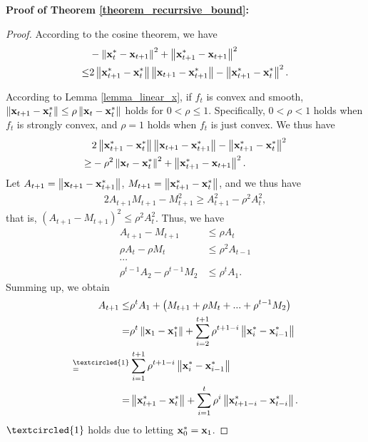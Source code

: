 \documentclass[journal]{IEEEtran}
\begin{document}
\textbf{Proof of Theorem \ref{theorem_recurrsive_bound}:}
\begin{proof}
According to the cosine theorem, we have 
\begin{align}
\label{equa_cosine}
&-  \lrnorm{\x_t^{\ast} - \x_{t+1}}^2   + \lrnorm { \x_{t+1}^{\ast} - \x_{t+1} }^2 \\ \nonumber 
\le &  2 \lrnorm {\x_{t+1}^{\ast} - \x_t^{\ast}} \lrnorm{\x_{t+1} - \x_{t+1}^{\ast}} - \lrnorm{\x_{t+1}^{\ast} - \x_t^{\ast}}^2.
\end{align} 

According to Lemma \ref{lemma_linear_x}, if $f_t$ is convex and smooth,  $\left\lVert{\bf x}_{t+1} - {\bf x}_t^{\ast}\right\rVert  \le \rho \left\lVert{\bf x}_{t} - {\bf x}_t^{\ast}\right\rVert$ holds for $0<\rho\le 1$. Specifically, $0<\rho <1$ holds when $f_t$ is strongly convex, and $\rho=1$ holds when $f_t$ is just convex.  We thus have 
\begin{align}
\nonumber
& 2 \left\lVert{\bf x}_{t+1}^{\ast} - {\bf x}_t^{\ast}\right\rVert \left\lVert{\bf x}_{t+1} - {\bf x}_{t+1}^{\ast}\right\rVert - \left\lVert{\bf x}_{t+1}^{\ast} - {\bf x}_t^{\ast}\right\rVert^2 \\ \nonumber  
\ge & -  \rho^2 \left\lVert{\bf x}_{t} - {\bf x}_t^{\ast}\right\rVert^2   + \left\lVert {\bf x}_{t+1}^{\ast} - {\bf x}_{t+1} \right\rVert^2.
\end{align} Let $A_{t+1} = \left\lVert{\bf x}_{t+1} - {\bf x}_{t+1}^{\ast}\right\rVert$, $M_{t+1} = \left\lVert{\bf x}_{t+1}^{\ast} - {\bf x}_t^{\ast}\right\rVert$, and we thus have 
\begin{align}
\nonumber
2A_{t+1}M_{t+1} - M_{t+1}^2 \ge A_{t+1}^2 - \rho^2 A_t^2,
\end{align} that is, $(A_{t+1} - M_{t+1})^2 \le \rho^2A_t^2$. Thus, we have 
\begin{align}
\nonumber
A_{t+1} - M_{t+1} &\le \rho A_t \\ \nonumber
\rho A_{t} - \rho M_{t} &\le \rho^2 A_{t-1} \\ \nonumber
\cdots &  \\ \nonumber
\rho^{t-1} A_{2} - \rho^{t-1} M_{2} &\le \rho^t A_{1}.
\end{align} Summing up, we obtain
\begin{align}
\nonumber
A_{t+1} \le &  \rho^{t}A_1 + \left( M_{t+1} + \rho M_{t} + ... + \rho^{t-1}M_2 \right) \\ \nonumber
= & \rho^{t}\lrnorm{\x_1 - \x_1^\ast} + \sum_{i=2}^{t+1} \rho^{t+1-i} \lrnorm{\x_i^{\ast} - \x_{i-1}^{\ast}} \\ \nonumber
\refabovecir{=}{\textcircled{1}} & \sum_{i=1}^{t+1} \rho^{t+1-i} \lrnorm{\x_i^{\ast} - \x_{i-1}^{\ast}}   \\ \label{equa_A_upper_bound}
= & \lrnorm{\x_{t+1}^{\ast} - \x_t^{\ast}}  +  \sum\limits_{i=1}^{t}\rho^i \lrnorm{\x_{t+1-i}^{\ast} - \x_{t-i}^{\ast}}. 
\end{align} $\textcircled{1}$ holds due to letting ${\bf x}_0^\ast = {\bf x}_1$.


\end{proof}
\end{document}
